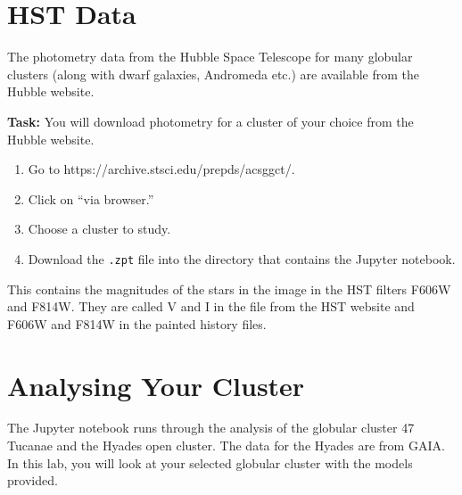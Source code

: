\documentclass{article}
\begin{document}
\section{HST Data}

The photometry data from the Hubble Space Telescope for many globular clusters (along with dwarf galaxies, Andromeda etc.) are available from the Hubble website.

\textbf{Task:}
You will download photometry for a cluster of your choice from the Hubble website.
\begin{enumerate}
 \setlength\itemsep{0em}
\item Go to https://archive.stsci.edu/prepds/acsggct/.  
\item Click on ``via browser.''
\item Choose a cluster to study.
\item Download the \texttt{.zpt} file into the directory that contains the Jupyter notebook.  
\end{enumerate}
This contains the magnitudes of the stars in the image in the HST filters F606W and F814W.  They are called V and I in the file from the HST website and F606W and F814W in the painted history files.

\section{Analysing Your Cluster}

The Jupyter notebook runs through the analysis of the globular cluster 47 Tucanae and the Hyades open cluster.  The data for the Hyades are from GAIA.  In this lab, you will look at your selected globular cluster with the models provided.
\end{document}
